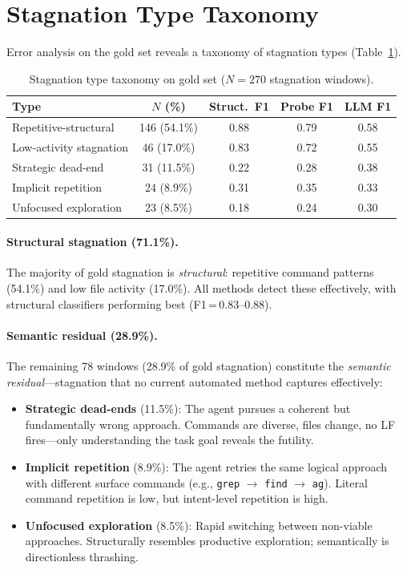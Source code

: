 \documentclass[11pt]{article}
\begin{document}
\section{Stagnation Type Taxonomy}
\label{sec:taxonomy}

Error analysis on the gold set reveals a taxonomy of stagnation types (Table~\ref{tab:taxonomy}).

\begin{table}[t]
\centering
\small
\caption{Stagnation type taxonomy on gold set ($N\!=\!270$ stagnation windows).}
\label{tab:taxonomy}
\begin{tabular}{lcccc}
\toprule
Type & $N$ (\%) & Struct.\ F1 & Probe F1 & LLM F1 \\
\midrule
Repetitive-structural & 146 (54.1\%) & 0.88 & 0.79 & 0.58 \\
Low-activity stagnation & 46 (17.0\%) & 0.83 & 0.72 & 0.55 \\
\midrule
Strategic dead-end & 31 (11.5\%) & 0.22 & 0.28 & 0.38 \\
Implicit repetition & 24 (8.9\%) & 0.31 & 0.35 & 0.33 \\
Unfocused exploration & 23 (8.5\%) & 0.18 & 0.24 & 0.30 \\
\bottomrule
\end{tabular}
\end{table}

\paragraph{Structural stagnation (71.1\%).}
The majority of gold stagnation is \emph{structural}: repetitive command patterns (54.1\%) and low file activity (17.0\%). All methods detect these effectively, with structural classifiers performing best (F1\,=\,0.83--0.88).

\paragraph{Semantic residual (28.9\%).}
The remaining 78 windows (28.9\% of gold stagnation) constitute the \emph{semantic residual}---stagnation that no current automated method captures effectively:
\begin{itemize}[leftmargin=*,itemsep=1pt]
\item \textbf{Strategic dead-ends} (11.5\%): The agent pursues a coherent but fundamentally wrong approach. Commands are diverse, files change, no LF fires---only understanding the task goal reveals the futility.
\item \textbf{Implicit repetition} (8.9\%): The agent retries the same logical approach with different surface commands (e.g., \texttt{grep} $\to$ \texttt{find} $\to$ \texttt{ag}). Literal command repetition is low, but intent-level repetition is high.
\item \textbf{Unfocused exploration} (8.5\%): Rapid switching between non-viable approaches. Structurally resembles productive exploration; semantically is directionless thrashing.
\end{itemize}
\end{document}
